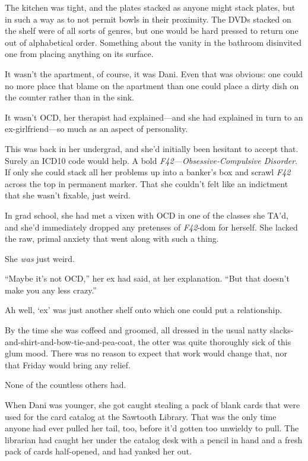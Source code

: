 The kitchen was tight, and the plates stacked as anyone might stack plates, but in such a way as to not permit bowls in their proximity. The DVDs stacked on the shelf were of all sorts of genres, but one would be hard pressed to return one out of alphabetical order. Something about the vanity in the bathroom disinvited one from placing anything on its surface.

It wasn't the apartment, of course, it was Dani. Even that was obvious: one could no more place that blame on the apartment than one could place a dirty dish on the counter rather than in the sink.

It wasn't OCD, her therapist had explained---and she had explained in turn to an ex-girlfriend---so much as an aspect of personality.

This was back in her undergrad, and she'd initially been hesitant to accept that. Surely an ICD10 code would help. A bold \emph{F42---Obsessive-Compulsive Disorder}. If only she could stack all her problems up into a banker's box and scrawl \emph{F42} across the top in permanent marker. That she couldn't felt like an indictment that she wasn't fixable, just weird.

In grad school, she had met a vixen with OCD in one of the classes she TA'd, and she'd immediately dropped any pretenses of \emph{F42}-dom for herself. She lacked the raw, primal anxiety that went along with such a thing.

She \emph{was} just weird.

``Maybe it's not OCD,'' her ex had said, at her explanation. ``But that doesn't make you any less crazy.''

Ah well, `ex' was just another shelf onto which one could put a relationship.

By the time she was coffeed and groomed, all dressed in the usual natty slacks-and-shirt-and-bow-tie-and-pea-coat, the otter was quite thoroughly sick of this glum mood. There was no reason to expect that work would change that, nor that Friday would bring any relief.

None of the countless others had.

\secdiv{}

\noindent When Dani was younger, she got caught stealing a pack of blank cards that were used for the card catalog at the Sawtooth Library. That was the only time anyone had ever pulled her tail, too, before it'd gotten too unwieldy to pull. The librarian had caught her under the catalog desk with a pencil in hand and a fresh pack of cards half-opened, and had yanked her out.

